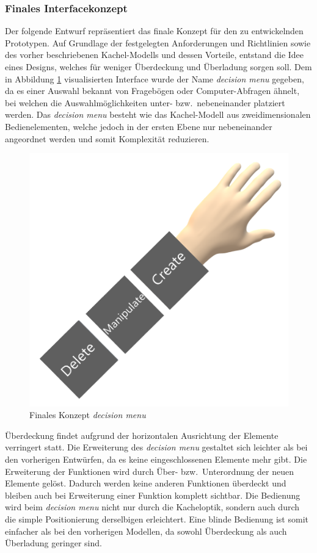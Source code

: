 \subsubsection{Finales Interfacekonzept}
\noindent Der folgende Entwurf repräsentiert das finale Konzept für den zu entwickelnden Prototypen. Auf Grundlage der festgelegten Anforderungen und Richtlinien sowie des vorher beschriebenen Kachel-Modells und dessen Vorteile, entstand die Idee eines Designs, welches für weniger Überdeckung und Überladung sorgen soll. Dem in Abbildung \ref{fig:decisionmenu1} visualisierten Interface wurde der Name \textit{decision menu} gegeben, da es einer Auswahl bekannt von Fragebögen oder Computer-Abfragen ähnelt, bei welchen die Auswahlmöglichkeiten unter- bzw.~nebeneinander platziert werden. Das \textit{decision menu} besteht wie das Kachel-Modell aus zweidimensionalen Bedienelementen, welche jedoch in der ersten Ebene nur nebeneinander angeordnet werden und somit Komplexität reduzieren.

\begin{figure}[h]
\captionsetup{width=.7\linewidth}
\includegraphics[scale=0.5]{Bilder/Hauptteil/konzept14}
\centering
\caption{Finales Konzept \textit{decision menu}}
\label{fig:decisionmenu1}
\end{figure}

\noindent Überdeckung findet aufgrund der horizontalen Ausrichtung der Elemente verringert statt. Die Erweiterung des \textit{decision menu} gestaltet sich leichter als bei den vorherigen Entwürfen, da es keine eingeschlossenen Elemente mehr gibt. Die Erweiterung der Funktionen wird durch Über- bzw.~Unterordnung der neuen Elemente gelöst. Dadurch werden keine anderen Funktionen überdeckt und bleiben auch bei Erweiterung einer Funktion komplett sichtbar. Die Bedienung wird beim \textit{decision menu} nicht nur durch die Kacheloptik, sondern auch durch die simple Positionierung derselbigen erleichtert. Eine blinde Bedienung ist somit einfacher als bei den vorherigen Modellen, da sowohl Überdeckung als auch Überladung geringer sind.

